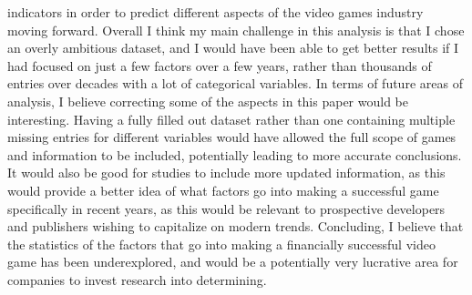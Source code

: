 \documentclass[12pt]{article}
\begin{document}
indicators in order to predict different aspects of the video games industry moving forward.
Overall I think my main challenge in this analysis is that I chose an overly ambitious dataset, and I would have been able to get better results if I had focused on just a few factors over a few years, rather than thousands of entries over decades with a lot of categorical variables.
In terms of future areas of analysis, I believe correcting some of the aspects in this paper would be interesting. Having a fully filled
out dataset rather than one containing multiple missing entries for different variables would have allowed the full scope of games and information to be included, 
potentially leading to more accurate conclusions. It would also be good for studies to include more updated information, as this would provide a better idea
of what factors go into making a successful game specifically in recent years, as this would be relevant to prospective developers and publishers wishing to capitalize on modern trends.
Concluding, I believe that the statistics of the factors that go into making a financially successful video game has been underexplored, 
and would be a potentially very lucrative area for companies to invest research into determining.




\end{document}
